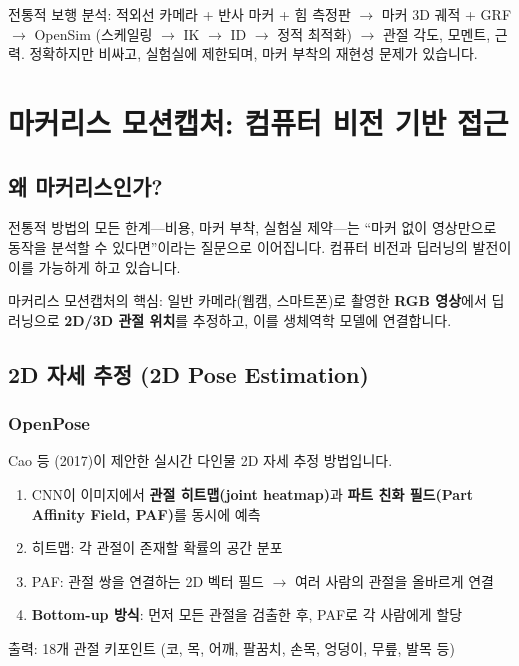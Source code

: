 \documentclass[11pt, a4paper]{report}
\begin{document}
\begin{summary}
전통적 보행 분석: 적외선 카메라 + 반사 마커 + 힘 측정판 $\rightarrow$ 마커 3D 궤적 + GRF $\rightarrow$ OpenSim (스케일링 $\rightarrow$ IK $\rightarrow$ ID $\rightarrow$ 정적 최적화) $\rightarrow$ 관절 각도, 모멘트, 근력. 정확하지만 비싸고, 실험실에 제한되며, 마커 부착의 재현성 문제가 있습니다.
\end{summary}


\chapter{마커리스 모션캡처: 컴퓨터 비전 기반 접근}
\label{ch:markerless}

\section{왜 마커리스인가?}

전통적 방법의 모든 한계---비용, 마커 부착, 실험실 제약---는 ``마커 없이 영상만으로 동작을 분석할 수 있다면''이라는 질문으로 이어집니다. 컴퓨터 비전과 딥러닝의 발전이 이를 가능하게 하고 있습니다.

\begin{keyidea}
마커리스 모션캡처의 핵심: 일반 카메라(웹캠, 스마트폰)로 촬영한 \textbf{RGB 영상}에서 딥러닝으로 \textbf{2D/3D 관절 위치}를 추정하고, 이를 생체역학 모델에 연결합니다.
\end{keyidea}


\section{2D 자세 추정 (2D Pose Estimation)}

\subsection{OpenPose}

Cao 등 (2017)이 제안한 실시간 다인물 2D 자세 추정 방법입니다.

\begin{cvbox}[title={OpenPose 작동 원리}]
\begin{enumerate}[leftmargin=*]
  \item CNN이 이미지에서 \textbf{관절 히트맵(joint heatmap)}과 \textbf{파트 친화 필드(Part Affinity Field, PAF)}를 동시에 예측
  \item 히트맵: 각 관절이 존재할 확률의 공간 분포
  \item PAF: 관절 쌍을 연결하는 2D 벡터 필드 $\rightarrow$ 여러 사람의 관절을 올바르게 연결
  \item \textbf{Bottom-up 방식}: 먼저 모든 관절을 검출한 후, PAF로 각 사람에게 할당
\end{enumerate}
출력: 18개 관절 키포인트 (코, 목, 어깨, 팔꿈치, 손목, 엉덩이, 무릎, 발목 등)
\end{cvbox}
\end{document}
